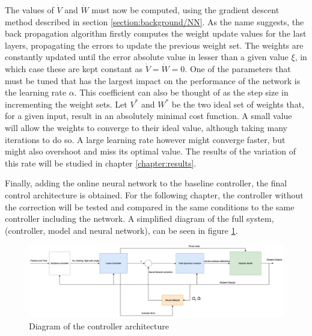 The values of $\dot{V}$ and $\dot{W}$ must now be computed, using the gradient descent method described in section \ref{section:background/NN}. As the name suggests, the back propagation algorithm firstly computes the weight update values for the last layers, propagating the errors to update the previous weight set. The weights are constantly updated until the error absolute value in lesser than a given value $\xi$, in which case these are kept constant as $\dot{V}=\dot{W}=0$. 
One of the parameters that must be tuned that has the largest impact on the performance of the network is the learning rate $\alpha$. This coefficient can also be thought of as the step size in incrementing the weight sets. Let $V^*$ and $W^*$ be the two ideal set of weights that, for a given input, result in an absolutely minimal cost function. A small value will allow the weights to converge to their ideal value, although taking many iterations to do so. A large learning rate however might converge faster, but might also overshoot and miss its optimal value. The results of the variation of this rate will be studied in chapter \ref{chapter:results}.

Finally, adding the online neural network to the baseline controller, the final control architecture is obtained. For the following chapter, the controller without the correction will be tested and compared in the same conditions to the same controller including the network. A simplified diagram of the full system, (controller, model and neural network), can be seen in figure \ref{fig:full_controller}.
\begin{figure}[!htb]
  
  \includegraphics[width=1.1\textwidth]{Figures/full_controller.png}
  \caption[Diagram of the controller architecture]{Diagram of the controller architecture}
  \label{fig:full_controller}
\end{figure}
